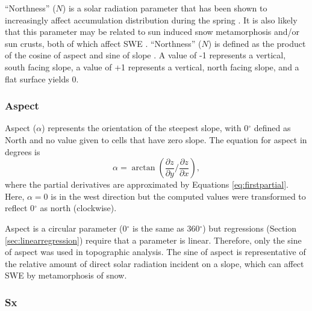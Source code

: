 \documentclass[12pt]{article}
\begin{document}
``Northness'' ($N$) is a solar radiation parameter that has been shown to  increasingly affect accumulation distribution during the spring \citep{Revuelto2014}. It is also likely that this parameter may be related to sun induced snow metamorphosis and/or sun crusts, both of which affect SWE \citep{McGrath2015}. ``Northness'' ($N$) is defined as the product of the cosine of aspect and sine of slope \citep{Molotch2005}. A value of -1 represents a vertical, south facing slope, a value of +1 represents a vertical, north facing slope, and a flat surface yields 0. 

\subsubsection*{Aspect} 

Aspect ($\alpha$) represents the orientation of the steepest slope, with 0${^\circ}$ defined as North and no value given to cells that have zero slope. The equation for aspect in degrees is \citep{Neteler2008}
	\begin{equation}
	\alpha = \arctan\left(\frac{\partial z}{\partial y} \bigg/ \frac{\partial z}{\partial x}\right), 
	\end{equation}
where the partial derivatives are approximated by Equations \ref{eq:firstpartial}. Here, $\alpha = 0$ is in the west direction but the computed values were transformed to reflect 0${^\circ}$ as north (clockwise). 

Aspect is a circular parameter (0${^\circ}$ is the same as 360${^\circ}$) but regressions (Section \ref{sec:linearregression}) require that a parameter is linear. Therefore, only the sine of aspect was used in topographic analysis. The sine of aspect is representative of the relative amount of direct solar radiation incident on a slope, which can affect SWE by metamorphosis of snow. 

\subsubsection*{Sx} 
\end{document}
